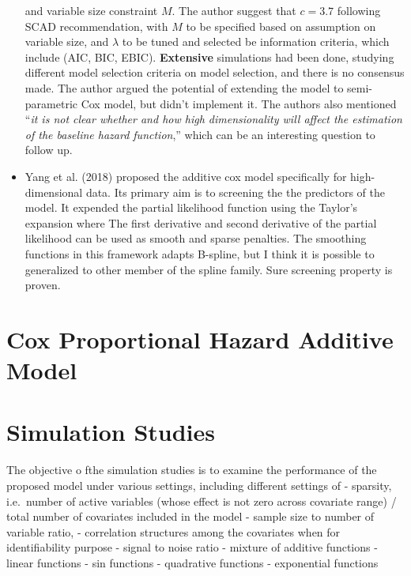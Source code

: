 \documentclass{article}
\begin{document}
\begin{itemize}
  and variable size constraint \(M\). The author suggest that \(c=3.7\)
  following SCAD recommendation, with \(M\) to be specified based on
  assumption on variable size, and \(\lambda\) to be tuned and selected
  be information criteria, which include (AIC, BIC, EBIC).
  \textbf{Extensive} simulations had been done, studying different model
  selection criteria on model selection, and there is no consensus made.
  The author argued the potential of extending the model to
  semi-parametric Cox model, but didn't implement it. The authors also
  mentioned ``\emph{it is not clear whether and how high dimensionality
  will affect the estimation of the baseline hazard function},'' which
  can be an interesting question to follow up.
\item
  Yang et al. (2018) proposed the additive cox model specifically for
  high-dimensional data. Its primary aim is to screening the the
  predictors of the model. It expended the partial likelihood function
  using the Taylor's expansion where The first derivative and second
  derivative of the partial likelihood can be used as smooth and sparse
  penalties. The smoothing functions in this framework adapts B-spline,
  but I think it is possible to generalized to other member of the
  spline family. Sure screening property is proven.
\end{itemize}

\newpage

\hypertarget{cox-proportional-hazard-additive-model}{%
\section{Cox Proportional Hazard Additive
Model}\label{cox-proportional-hazard-additive-model}}

\newpage

\hypertarget{simulation-studies}{%
\section{Simulation Studies}\label{simulation-studies}}

The objective o fthe simulation studies is to examine the performance of
the proposed model under various settings, including different settings
of - sparsity, i.e.~number of active variables (whose effect is not zero
across covariate range) / total number of covariates included in the
model - sample size to number of variable ratio, - correlation
structures among the covariates when for identifiability purpose -
signal to noise ratio - mixture of additive functions - linear functions
- sin functions - quadrative functions - exponential functions
\end{document}
